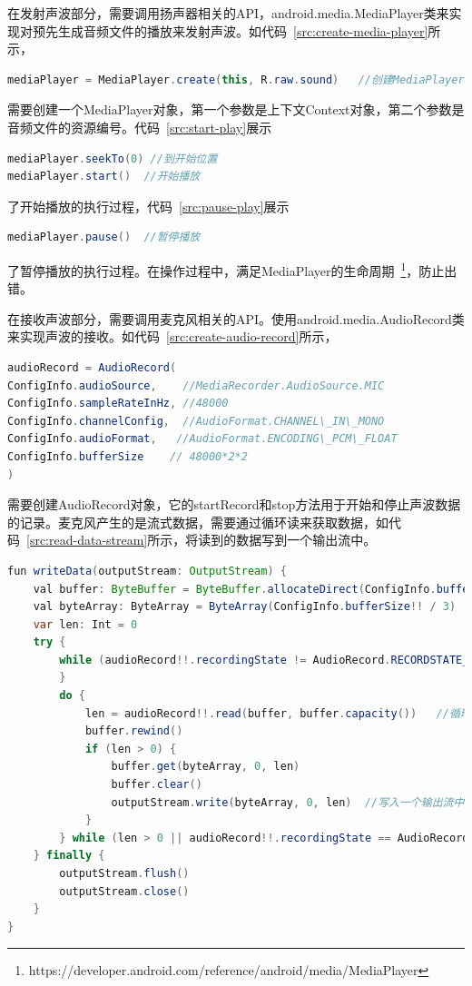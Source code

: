 在发射声波部分，需要调用扬声器相关的API，android.media.MediaPlayer类来实现对预先生成音频文件的播放来发射声波。如代码~\ref{src:create-media-player}所示，
\begin{lstlisting}[language={Java}, caption={创建MediaPlayer对象 \label{src:create-media-player}}]
mediaPlayer = MediaPlayer.create(this, R.raw.sound)   //创建MediaPlayer对象
\end{lstlisting}
需要创建一个MediaPlayer对象，第一个参数是上下文Context对象，第二个参数是音频文件的资源编号。代码~\ref{src:start-play}展示
\begin{lstlisting}[language={Java}, caption={开始播放 \label{src:start-play}}]
mediaPlayer.seekTo(0) //到开始位置
mediaPlayer.start()  //开始播放
\end{lstlisting}
了开始播放的执行过程，代码~\ref{src:pause-play}展示
\begin{lstlisting}[language={Java}, caption={暂停播放\label{src:pause-play}} ]
mediaPlayer.pause()  //暂停播放
\end{lstlisting}
了暂停播放的执行过程。在操作过程中，满足MediaPlayer的生命周期~\footnote{https://developer.android.com/reference/android/media/MediaPlayer}，防止出错。

在接收声波部分，需要调用麦克风相关的API。使用android.media.AudioRecord类来实现声波的接收。如代码~\ref{src:create-audio-record}所示，
\begin{lstlisting}[language={Java}, caption={创建AudioRecord对象 \label{src:create-audio-record}} ]
audioRecord = AudioRecord(
ConfigInfo.audioSource,    //MediaRecorder.AudioSource.MIC
ConfigInfo.sampleRateInHz, //48000
ConfigInfo.channelConfig,  //AudioFormat.CHANNEL\_IN\_MONO
ConfigInfo.audioFormat,   //AudioFormat.ENCODING\_PCM\_FLOAT
ConfigInfo.bufferSize    // 48000*2*2
)
\end{lstlisting}
需要创建AudioRecord对象，它的startRecord和stop方法用于开始和停止声波数据的记录。麦克风产生的是流式数据，需要通过循环读来获取数据，如代码~\ref{src:read-data-stream}所示，将读到的数据写到一个输出流中。
\begin{lstlisting}[language={Java}, caption={读取数据流 \label{src:read-data-stream}} ]
fun writeData(outputStream: OutputStream) {
    val buffer: ByteBuffer = ByteBuffer.allocateDirect(ConfigInfo.bufferSize!! / 3) //创建Direct内存缓存区
    val byteArray: ByteArray = ByteArray(ConfigInfo.bufferSize!! / 3)   //创建缓存数组
    var len: Int = 0
    try {
        while (audioRecord!!.recordingState != AudioRecord.RECORDSTATE_RECORDING) {
        }
        do {
            len = audioRecord!!.read(buffer, buffer.capacity())   //循环读取数据流
            buffer.rewind()
            if (len > 0) {
                buffer.get(byteArray, 0, len)
                buffer.clear()
                outputStream.write(byteArray, 0, len)  //写入一个输出流中
            }
        } while (len > 0 || audioRecord!!.recordingState == AudioRecord.RECORDSTATE_RECORDING)
    } finally {
        outputStream.flush()
        outputStream.close()
    }
}
\end{lstlisting}


